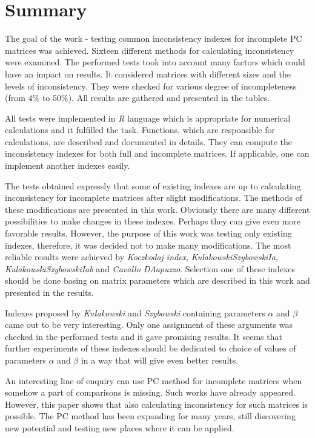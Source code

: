 \chapter{Summary}
\label{sec:summary}

The goal of the work - testing common inconsistency indexes for incomplete PC matrices was achieved. Sixteen different methods for calculating inconsistency were examined. The performed tests took into account many factors which could have an impact on results. It considered matrices with different sizes and the levels of inconsistency. They were checked for various degree of incompleteness (from $4\%$ to $50\%$). All results are gathered and presented in the tables.

All tests were implemented in \textit{R} language which is appropriate for numerical calculations and it fulfilled the task. Functions, which are responsible for calculations, are described and documented in details. They can compute the inconsistency indexes for both full and incomplete matrices. If applicable, one can implement another indexes easily.

The tests obtained expressly that some of existing indexes are up to calculating inconsistency for incomplete matrices after slight modifications. The methods of these modifications are presented in this work. Obviously there are many different possibilities to make changes in these indexes. Perhaps they can give even more favorable results. However, the purpose of this work was testing only existing indexes, therefore, it was decided not to make many modifications. The most reliable results were achieved by \textit{Koczkodaj index}, \textit{KulakowskiSzybowskiIa}, \textit{KulakowskiSzybowskiIab} and \textit{Cavallo DAapuzzo}. Selection one of these indexes should be done basing on matrix parameters which are described in this work and presented in the results.

Indexes proposed by \textit{Kułakowski} and \textit{Szybowski} containing parameters $\alpha$ and $\beta$ came out to be very interesting. Only one assignment of these arguments was checked in the performed tests and it gave promising results. It seems that further experiments of these indexes should be dedicated to choice of values of parameters $\alpha$ and $\beta$ in a way that will give even better results. 


An interesting line of enquiry can use PC method for incomplete matrices when somehow a part of comparisons is missing. Such works have already appeared. However, this paper shows that also calculating inconsistency for such matrices is possible. The PC method has been expanding for many years, still discovering new potential and testing new places where it can be applied.
